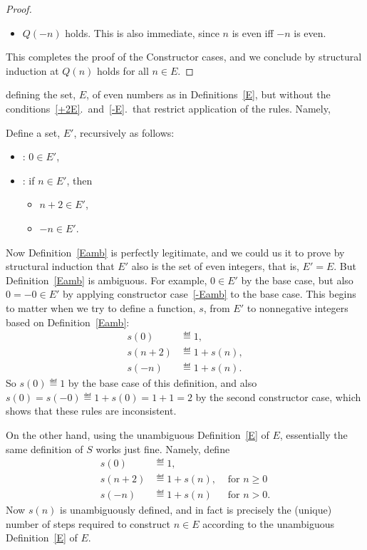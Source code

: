 \begin{definition}
\begin{editingnotes}
\begin{lemma*}
\begin{proof}
\begin{itemize}
\item $Q(-n)$ holds.  This is also immediate, since $n$ is even iff $-n$ is
even.

\end{itemize}

This completes the proof of the Constructor cases, and we conclude by
structural induction at $Q(n)$ holds for all $n \in E$.
\end{proof}

\end{lemma*}


defining the set, $E$, of even numbers as in Definitions~\ref{E}, but
without the conditions~\ref{+2E}.\ and~\ref{-E}.\ that restrict application of
the rules.  Namely,

\begin{definition}\label{Eamb}
Define a set, $E'$, recursively as follows:
\begin{itemize}
\item {}: $0 \in E'$,\label{0Eamb}
\item {}: if $n \in E'$, then
   \begin{itemize}
   \item $n+2 \in E'$, \label{+2Eamb}
   \item $-n \in E'$.\label{-Eamb}
   \end{itemize}
\end{itemize}
\end{definition}

Now Definition~\ref{Eamb} is perfectly legitimate, and we could us it to
prove by structural induction that $E'$ also is the set of even integers,
that is, $E'= E$.  But Definition~\ref{Eamb} is ambiguous.  For example,
$0\in E'$ by the base case, but also $0=-0 \in E'$ by applying constructor
case~\ref{-Eamb} to the base case.  This begins to matter when we try to
define a function, $s$, from $E'$ to nonnegative integers based on
Definition~\ref{Eamb}:
\begin{align*}
  s(0) & \eqdef 1,\\
s(n+2) & \eqdef 1+ s(n),\\
 s(-n) & \eqdef 1+ s(n).
\end{align*}
So $s(0) \eqdef 1$ by the base case of this definition, and also $s(0)=
s(-0) \eqdef 1+s(0) = 1 + 1 = 2$ by the second constructor case, which
shows that these rules are inconsistent.

On the other hand, using the unambiguous Definition~\ref{E} of $E$,
essentially the same definition of $S$ works just fine.  Namely, define
\begin{align*}
  s(0) & \eqdef 1,\\
  s(n+2) & \eqdef 1+ s(n), & \text{ for } n \geq 0\\
  s(-n) & \eqdef 1+ s(n) & \text{ for } n > 0.
\end{align*}
Now $s(n)$ is unambiguously defined, and in fact is precisely the (unique)
number of steps required to construct $n \in E$ according to the
unambiguous Definition~\ref{E} of $E$.


\end{editingnotes}
\end{definition}
